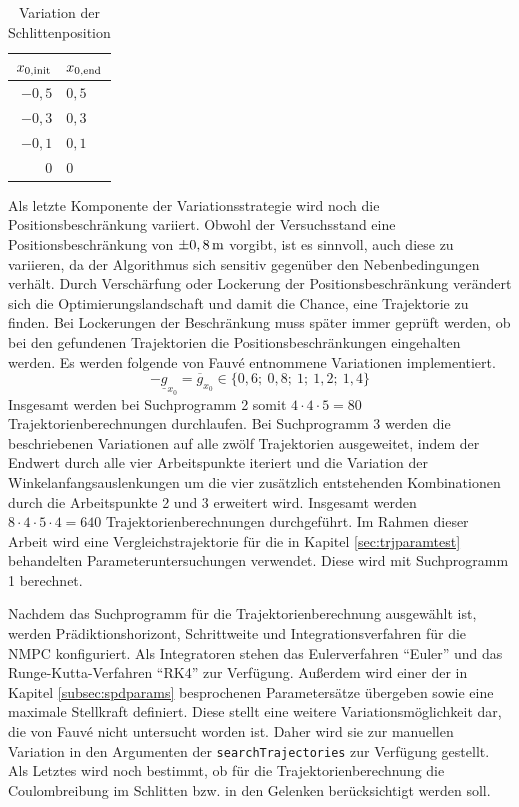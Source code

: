 \begin{table}[h]
	\centering
	\caption{Variation der Schlittenposition}
		\begin{tabular}{r|l}
			$x_{0\mathrm{,init}}$ & $x_{0\mathrm{,end}}$ \\
			\midrule
			$-0,5$ & $0,5$	\\	
			$-0,3$ & $0,3$	\\	
			$-0,1$ & $0,1$	\\	
			   $0$ &   $0$	\\
			
		\end{tabular}
	\label{tab:varpos}
\end{table}

Als letzte Komponente der Variationsstrategie wird noch die Positionsbeschränkung variiert. Obwohl der Versuchsstand eine Positionsbeschränkung von $\pm0,8\,\mathrm{m}$ vorgibt, ist es sinnvoll, auch diese zu variieren, da der Algorithmus sich sensitiv gegenüber den Nebenbedingungen verhält. Durch Verschärfung oder Lockerung der Positionsbeschränkung verändert sich die Optimierungslandschaft und damit die Chance, eine Trajektorie zu finden. Bei Lockerungen der Beschränkung muss später immer geprüft werden, ob bei den gefundenen Trajektorien die Positionsbeschränkungen eingehalten werden. Es werden folgende von Fauvé \cite{fauve} entnommene Variationen implementiert.
	\[
	-\underline{g}_{x_0} = \overline{g}_{x_0} \in \{ 0,6; \ 0,8; \ 1; \ 1,2; \ 1,4 \}  
\]
Insgesamt werden bei Suchprogramm 2 somit $4 \cdot 4 \cdot 5 = 80$ Trajektorienberechnungen durchlaufen. Bei Suchprogramm 3 werden die beschriebenen Variationen auf alle zwölf Trajektorien ausgeweitet, indem der Endwert durch alle vier Arbeitspunkte iteriert und die Variation der Winkelanfangsauslenkungen um die vier zusätzlich entstehenden Kombinationen durch die Arbeitspunkte 2 und 3 erweitert wird. Insgesamt werden $8 \cdot 4 \cdot 5 \cdot 4 = 640$ Trajektorienberechnungen durchgeführt.
Im Rahmen dieser Arbeit wird eine Vergleichstrajektorie für die in Kapitel \ref{sec:trjparamtest} behandelten Parameteruntersuchungen verwendet. Diese wird mit Suchprogramm 1 berechnet.

Nachdem das Suchprogramm für die Trajektorienberechnung ausgewählt ist, werden Prädiktionshorizont, Schrittweite und Integrationsverfahren für die NMPC konfiguriert. Als Integratoren stehen das Eulerverfahren "`Euler"' und das Runge-Kutta-Verfahren "`RK4"' zur Verfügung. Außerdem wird einer der in Kapitel \ref{subsec:spdparams} besprochenen Parametersätze übergeben sowie eine maximale Stellkraft definiert. Diese stellt eine weitere Variationsmöglichkeit dar, die von Fauvé \cite{fauve} nicht untersucht worden ist. Daher wird sie zur manuellen Variation in den Argumenten der \texttt{searchTrajectories} zur Verfügung gestellt.
Als Letztes wird noch bestimmt, ob für die Trajektorienberechnung die Coulombreibung im Schlitten bzw. in den Gelenken berücksichtigt werden soll. 

